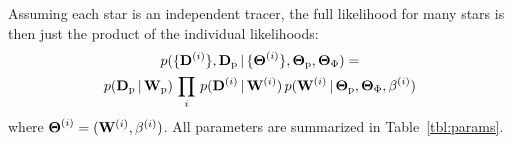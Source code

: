 \documentclass[letterpaper,12pt,preprint]{aastex}
\newcommand{\given}{\,|\,}
\newcommand{\D}{{\bf D}}
\newcommand{\W}{{\bf W}}
\newcommand{\bs}{\boldsymbol}
\newcommand{\sat}{{\rm p}}
\newcommand{\tailbit}{\beta}
\begin{document}
Assuming each star is an independent tracer, the full likelihood for many stars is then just the product of the individual likelihoods:
\begin{multline}
	p(\{\D^{(i)}\}, \D_\sat \given \{\bs{\Theta}^{(i)}\}, \bs{\Theta}_\sat, \bs{\Theta}_\Phi ) = \\
		p(\D_\sat \given \W_\sat) \, \prod_i \, p(\D^{(i)} \given \W^{(i)}) \,
			p(\W^{(i)} \given \bs{\Theta}_\sat, \bs{\Theta}_\Phi, \tailbit^{(i)})
\end{multline}
where $\bs{\Theta}^{(i)} = (\W^{(i)}, \tailbit^{(i)})$. All parameters are summarized in Table~\ref{tbl:params}.
\end{document}
